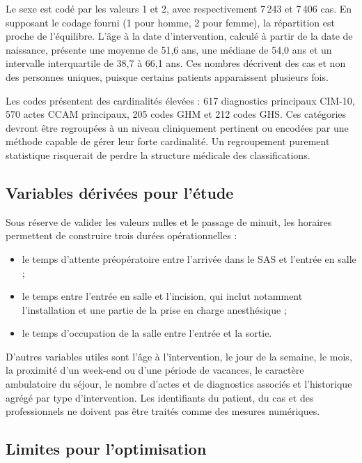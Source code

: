 Le sexe est codé par les valeurs 1 et 2, avec respectivement 7\,243 et 7\,406 cas. En supposant le codage fourni (1 pour homme, 2 pour femme), la répartition est proche de l'équilibre. L'âge à la date d'intervention, calculé à partir de la date de naissance, présente une moyenne de 51,6 ans, une médiane de 54,0 ans et un intervalle interquartile de 38,7 à 66,1 ans. Ces nombres décrivent des cas et non des personnes uniques, puisque certains patients apparaissent plusieurs fois.

Les codes présentent des cardinalités élevées : 617 diagnostics principaux CIM-10, 570 actes CCAM principaux, 205 codes GHM et 212 codes GHS. Ces catégories devront être regroupées à un niveau cliniquement pertinent ou encodées par une méthode capable de gérer leur forte cardinalité. Un regroupement purement statistique risquerait de perdre la structure médicale des classifications.

\subsection{Variables dérivées pour l'étude}

Sous réserve de valider les valeurs nulles et le passage de minuit, les horaires permettent de construire trois durées opérationnelles :

\begin{itemize}
  \item le temps d'attente préopératoire entre l'arrivée dans le SAS et l'entrée en salle ;
  \item le temps entre l'entrée en salle et l'incision, qui inclut notamment l'installation et une partie de la prise en charge anesthésique ;
  \item le temps d'occupation de la salle entre l'entrée et la sortie.
\end{itemize}

D'autres variables utiles sont l'âge à l'intervention, le jour de la semaine, le mois, la proximité d'un week-end ou d'une période de vacances, le caractère ambulatoire du séjour, le nombre d'actes et de diagnostics associés et l'historique agrégé par type d'intervention. Les identifiants du patient, du cas et des professionnels ne doivent pas être traités comme des mesures numériques.

\subsection{Limites pour l'optimisation}

